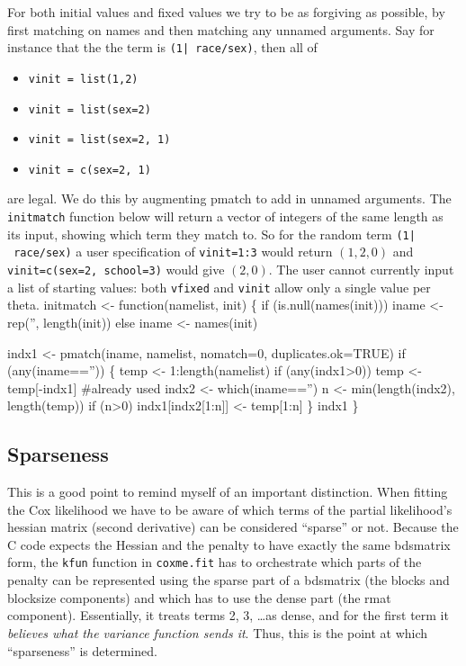 \documentclass{article}
\begin{document}
For both initial values and fixed values we try to be as forgiving
as possible, by first matching on names and then matching any
unnamed arguments.  
Say for instance that the the term is {\tt{}(1|\ race/sex)}, then all of
\begin{itemize}
  \item {\tt{}vinit\ =\ list(1,2)}
  \item {\tt{}vinit\ =\ list(sex=2)}
  \item {\tt{}vinit\ =\ list(sex=2,\ 1)}
  \item {\tt{}vinit\ =\ c(sex=2,\ 1)}
\end{itemize}
are legal.  We do this by augmenting pmatch to add in unnamed arguments.
The {\tt{}initmatch} function below will return a vector of 
integers of the same length as its input, showing
which term they match to.
So for the random term {\tt{}(1|\ race/sex)} a user specification of
{\tt{}vinit=1:3} would return $(1,2,0)$ and
{\tt{}vinit=c(sex=2,\ school=3)} would give $(2,0)$.
The user cannot currently input a list of starting values: both
{\tt{}vfixed} and {\tt{}vinit} allow only a single value per theta.
\nwenddocs{}\endmoddef
initmatch <- function(namelist, init) \{
    if (is.null(names(init))) iname <- rep('', length(init))
    else iname <- names(init)
    
    indx1 <- pmatch(iname, namelist, nomatch=0, duplicates.ok=TRUE)
    if (any(iname=='')) \{
        temp <- 1:length(namelist)
        if (any(indx1>0)) temp <- temp[-indx1]   #already used
        indx2 <- which(iname=='')
        n <- min(length(indx2), length(temp))
        if (n>0) indx1[indx2[1:n]] <- temp[1:n]
        \}
    indx1
    \}
\nwendcode{}\nwdocspar

\subsection{Sparseness}
This is a good point to remind myself of an important distinction.
When fitting the Cox likelihood we have to be aware of which terms of the
partial likelihood's hessian matrix (second derivative) can be      %
considered ``sparse'' or not.  Because the C code expects the Hessian and the
penalty to have exactly the same bdsmatrix form, the {\tt{}kfun} function
in {\tt{}coxme.fit} has to orchestrate which parts of the penalty 
can be represented using
the sparse part of a bdsmatrix (the blocks and blocksize components) and
which has to use the dense part (the rmat component).  
Essentially, it treats terms 2, 3, \ldots as dense, and for the first
term it \emph{believes what the variance function sends it}.
Thus, this is the point at which ``sparseness'' is determined.
\end{document}
